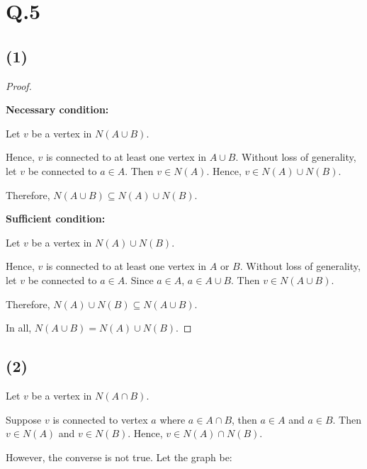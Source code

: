 \documentclass[a4paper,12pt]{article}
\begin{document}
\section*{Q.5}

\subsection*{(1)}

\begin{proof}
$ $

\textbf{Necessary condition:}

Let $v$ be a vertex in $N(A \cup B)$.

Hence, $v$ is connected to at least one vertex in $A \cup B$.
Without loss of generality, let $v$ be connected to $a \in A$.
Then $v \in N(A)$.
Hence, $v \in N(A) \cup N(B)$.

Therefore, $N(A \cup B) \subseteq N(A) \cup N(B)$.

\textbf{Sufficient condition:}

Let $v$ be a vertex in $N(A) \cup N(B)$.

Hence, $v$ is connected to at least one vertex in $A$ or $B$.
Without loss of generality, let $v$ be connected to $a \in A$.
Since $a \in A$, $a \in A \cup B$.
Then $v \in N(A \cup B)$.

Therefore, $N(A) \cup N(B) \subseteq N(A \cup B)$.

In all, $N(A \cup B) = N(A) \cup N(B)$.
\end{proof}

\subsection*{(2)}

Let $v$ be a vertex in $N(A \cap B)$.

Suppose $v$ is connected to vertex $a$ where $a \in A \cap B$, then $a \in A$ and $a \in B$.
Then $v \in N(A)$ and $v \in N(B)$.
Hence, $v \in N(A) \cap N(B)$.

However, the converse is not true.
Let the graph be:

\begin{center}
\end{center}
\end{document}
